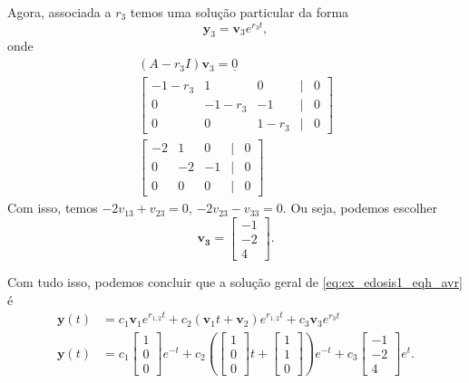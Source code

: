 \begin{ex}
  Agora, associada a $r_3$ temos uma solução particular da forma
  \begin{equation}
    \pmb{y}_3 = \pmb{v}_3e^{r_3t},
  \end{equation}
  onde
  \begin{gather}
    (A-r_3I)\pmb{v}_3 = \underline{0} \\
    \begin{bmatrix}
      -1-r_3 & 1 & 0 & | & 0 \\
      0 & -1-r_3 & -1 & | & 0 \\
      0 & 0 & 1-r_3 & | & 0 
    \end{bmatrix}\\
    \begin{bmatrix}
      -2 & 1 & 0 & | & 0 \\
      0 & -2 & -1 & | & 0 \\
      0 & 0 & 0 & | & 0 
    \end{bmatrix}
  \end{gather}  
  Com isso, temos $-2v_{13}+v_{23}=0$, $-2v_{23}-v_{33}=0$. Ou seja, podemos escolher
  \begin{equation}
    \pmb{v_3} =
    \begin{bmatrix}
      -1 \\
      -2 \\
      4
    \end{bmatrix}.
  \end{equation}

  Com tudo isso, podemos concluir que a solução geral de \eqref{eq:ex_edosis1_eqh_avr} é
  \begin{align}
    \pmb{y}(t) &= c_1\pmb{v}_1e^{r_{1,2}t}+c_2\left(\pmb{v}_1t+\pmb{v}_2\right)e^{r_{1,2}t} + c_3\pmb{v}_3e^{r_3t} \\
    \pmb{y}(t) &= c_1
    \begin{bmatrix}
      1\\
      0\\
      0
    \end{bmatrix}e^{-t} + c_2\left(
    \begin{bmatrix}
      1\\
      0\\
      0
    \end{bmatrix}t +
    \begin{bmatrix}
      1\\
      1\\
      0
    \end{bmatrix}\right)e^{-t} + c_3
    \begin{bmatrix}
      -1\\
      -2\\
      4
    \end{bmatrix}e^t.
  \end{align}
\end{ex}

